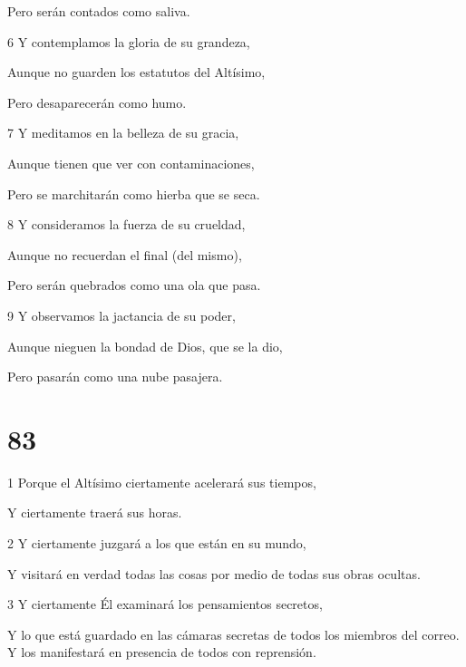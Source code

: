 \par Pero serán contados como saliva.

\par 6 Y contemplamos la gloria de su grandeza,

\par Aunque no guarden los estatutos del Altísimo,

\par Pero desaparecerán como humo.

\par 7 Y meditamos en la belleza de su gracia,

\par Aunque tienen que ver con contaminaciones,

\par Pero se marchitarán como hierba que se seca.

\par 8 Y consideramos la fuerza de su crueldad,

\par Aunque no recuerdan el final (del mismo),

\par Pero serán quebrados como una ola que pasa.

\par 9 Y observamos la jactancia de su poder,

\par Aunque nieguen la bondad de Dios, que se la dio,

\par Pero pasarán como una nube pasajera.

\chapter{83}

\par 1 Porque el Altísimo ciertamente acelerará sus tiempos,

\par Y ciertamente traerá sus horas.

\par 2 Y ciertamente juzgará a los que están en su mundo,

\par Y visitará en verdad todas las cosas por medio de todas sus obras ocultas.

\par 3 Y ciertamente Él examinará los pensamientos secretos,

\par Y lo que está guardado en las cámaras secretas de todos los miembros del correo. Y los manifestará en presencia de todos con reprensión.

